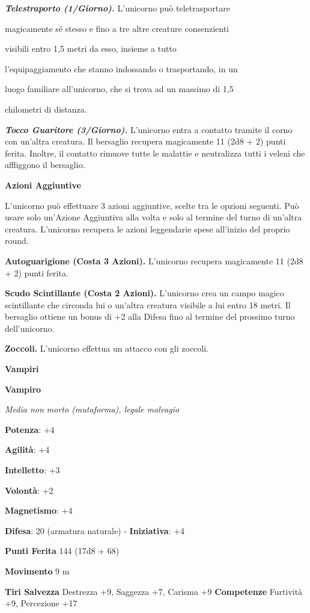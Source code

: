 \begin{multicols}{2}
\emph{\textbf{Telestraporto (1/Giorno).}} L'unicorno può teletrasportare

magicamente sé stesso e fino a tre altre creature consenzienti

visibili entro 1,5 metri da esso, insieme a tutto

l'equipaggiamento che stanno indossando o trasportando, in un

luogo familiare all'unicorno, che si trova ad un massimo di 1,5

chilometri di distanza.

\emph{\textbf{Tocco Guaritore (3/Giorno).}} L'unicorno entra a contatto
tramite il corno con un'altra creatura. Il bersaglio recupera
magicamente 11 (2d8 + 2) punti ferita. Inoltre, il contatto rimuove
tutte le malattie e neutralizza tutti i veleni che affliggono il
bersaglio.

\textbf{Azioni Aggiuntive}

L'unicorno può effettuare 3 azioni aggiuntive, scelte tra le opzioni
seguenti. Può usare solo un'Azione Aggiuntiva alla volta e solo al
termine del turno di un'altra creatura. L'unicorno recupera le azioni
leggendarie spese all'inizio del proprio round.

\textbf{Autoguarigione (Costa 3 Azioni).} L'unicorno recupera
magicamente 11 (2d8 + 2) punti ferita.

\textbf{Scudo Scintillante (Costa 2 Azioni).} L'unicorno crea un campo
magico scintillante che circonda lui o un'altra creatura visibile a lui
entro 18 metri. Il bersaglio ottiene un bonus di +2 alla Difesa fino al
termine del prossimo turno dell'unicorno.

\textbf{Zoccoli.} L'unicorno effettua un attacco con gli zoccoli.

\textbf{Vampiri}

\textbf{Vampiro}

\emph{Media non morto (mutaforma), legale malvagio}

\textbf{Potenza}: +4

\textbf{Agilità}: +4

\textbf{Intelletto}: +3

\textbf{Volontà}: +2

\textbf{Magnetismo}: +4

\textbf{Difesa}: 20 (armatura naturale) - \textbf{Iniziativa}: +4

\textbf{Punti Ferita} 144 (17d8 + 68)

\textbf{Movimento} 9 m

\textbf{Tiri Salvezza} Destrezza +9, Saggezza +7, Carisma +9
\textbf{Competenze} Furtività +9, Percezione +17


\end{multicols}
